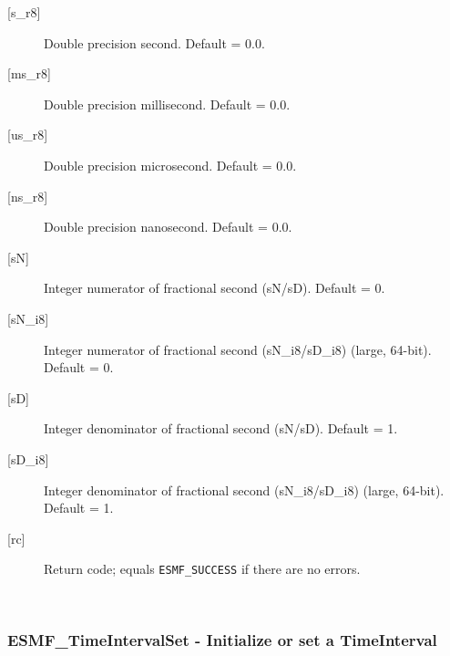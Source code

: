 \begin{description}
       \item[{[s\_r8]}]
            Double precision second.  Default = 0.0.
       \item[{[ms\_r8]}]
            Double precision millisecond.  Default = 0.0.
       \item[{[us\_r8]}]
            Double precision microsecond.  Default = 0.0.
       \item[{[ns\_r8]}]
            Double precision nanosecond.  Default = 0.0.
       \item[{[sN]}]
            Integer numerator of fractional second (sN/sD).
            Default = 0.
       \item[{[sN\_i8]}]
            Integer numerator of fractional second (sN\_i8/sD\_i8)
                                                             (large, 64-bit).
            Default = 0.
       \item[{[sD]}]
            Integer denominator of fractional second (sN/sD).
            Default = 1.
       \item[{[sD\_i8]}]
            Integer denominator of fractional second (sN\_i8/sD\_i8)
                                                             (large, 64-bit).
            Default = 1.
       \item[{[rc]}]
            Return code; equals {\tt ESMF\_SUCCESS} if there are no errors.
       \end{description}
   
 
\mbox{}\hrulefill\ 
 
\subsubsection [ESMF\_TimeIntervalSet] {ESMF\_TimeIntervalSet - Initialize or set a TimeInterval}


